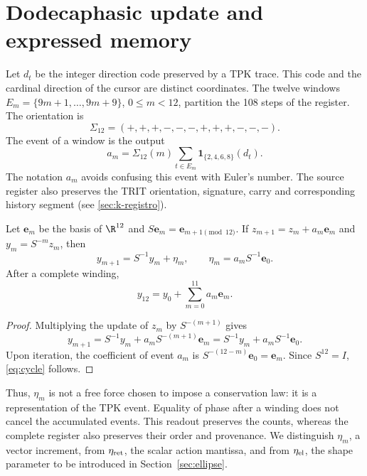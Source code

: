 \section{Dodecaphasic update and expressed memory}
\label{sec:eta}
Let $d_t$ be the integer direction code preserved by a TPK trace.
This code and the cardinal direction of the cursor are distinct coordinates.
The twelve windows
$E_m=\{9m+1,\ldots,9m+9\}$, $0\le m<12$, partition the 108 steps of the register.
The orientation is
\[
\Sigma_{12}=(+,+,+,-,-,-,+,+,+,-,-,-).
\]
The event of a window is the output
\begin{equation}
a_m=\Sigma_{12}(m)
\sum_{t\in E_m}\mathbf1_{\{2,4,6,8\}}(d_t).
\label{eq:events}
\end{equation}
The notation $a_m$ avoids confusing this event with Euler's number.
The source register also preserves the TRIT orientation, signature,
carry and corresponding history segment (see \ref{sec:k-registro}).

\begin{proposition}
Let $\mathbf e_m$ be the basis of $\R^{12}$ and
$S\mathbf e_m=\mathbf e_{m+1\pmod{12}}$. If
$z_{m+1}=z_m+a_m\mathbf e_m$ and $y_m=S^{-m}z_m$, then
\begin{equation}
y_{m+1}=S^{-1}y_m+\eta_m,
\qquad
\eta_m=a_mS^{-1}\mathbf e_0.
\label{eq:eta}
\end{equation}
After a complete winding,
\begin{equation}
y_{12}=y_0+\sum_{m=0}^{11}a_m\mathbf e_m.
\label{eq:cycle}
\end{equation}
\end{proposition}
\begin{proof}
Multiplying the update of $z_m$ by $S^{-(m+1)}$ gives
\[
y_{m+1}=S^{-1}y_m+a_mS^{-(m+1)}\mathbf e_m
=S^{-1}y_m+a_mS^{-1}\mathbf e_0.
\]
Upon iteration, the coefficient of event $a_m$ is
$S^{-(12-m)}\mathbf e_0=\mathbf e_m$. Since $S^{12}=I$,
\eqref{eq:cycle} follows.
\end{proof}

Thus, $\eta_m$ is not a free force chosen to impose a
conservation law: it is a representation of the TPK event. Equality of phase
after a winding does not cancel the accumulated events. This readout
preserves the counts, whereas the complete register also preserves their
order and provenance. We distinguish $\eta_m$, a vector increment, from
$\eta_{\rm ret}$, the scalar action mantissa, and from $\eta_{\rm el}$,
the shape parameter to be introduced in Section~\ref{sec:ellipse}.

